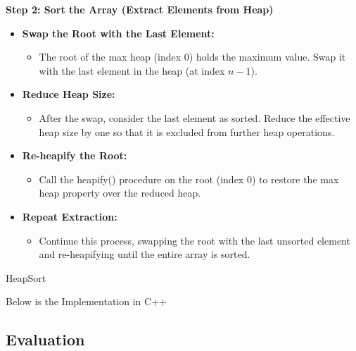 \textbf{Step 2: Sort the Array (Extract Elements from Heap)}
\begin{itemize}
    \item \textbf{Swap the Root with the Last Element:}
    \begin{itemize}
        \item The root of the max heap (index 0) holds the maximum value. Swap it with the last element in the heap (at index $n-1$).
    \end{itemize}
    \item \textbf{Reduce Heap Size:}
    \begin{itemize}
        \item After the swap, consider the last element as sorted. Reduce the effective heap size by one so that it is excluded from further heap operations.
    \end{itemize}
    \item \textbf{Re-heapify the Root:}
    \begin{itemize}
        \item Call the heapify() procedure on the root (index 0) to restore the max heap property over the reduced heap.
    \end{itemize}
    \item \textbf{Repeat Extraction:}
    \begin{itemize}
        \item Continue this process, swapping the root with the last unsorted element and re-heapifying until the entire array is sorted.
    \end{itemize}
\end{itemize}

\begin{algorithm}
    \caption{HeapSort}
    \begin{algorithmic}[1]
        \State {}
        \State {}
        \State {}
        \EndFor
        \EndFunction
    \end{algorithmic}
\end{algorithm}

Below is the Implementation in C++



\subsection{Evaluation}

